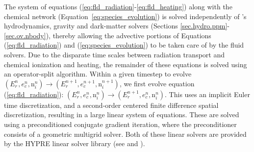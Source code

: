 
The system of equations
(\ref{eq:fld_radiation}-\ref{eq:fld_heating}) along with the chemical network 
(Equation~\ref{eq:species_evolution}) is solved
independently of \enzo's hydrodynamics, gravity and dark-matter solvers
(Sections \ref{sec.hydro.ppm}-\ref{sec.ov.nbody}), thereby allowing
the advective portions of Equations (\ref{eq:fld_radiation}) and
(\ref{eq:species_evolution}) to be taken care of by the fluid solvers.
Due to the disparate time scales between radiation transport and chemical
ionization and heating, the remainder of these equations is solved
using an operator-split algorithm.  Within a given timestep to evolve
$(E_r^n, e_c^n, {\mathrm n}_i^n) \to (E_r^{n+1}, e_c^{n+1}, {\mathrm
n}_i^{n+1})$, we first evolve equation (\ref{eq:fld_radiation}):
$(E_r^n, e_c^n, {\mathrm n}_i^n) \to (E_r^{n+1}, e_c^{n}, {\mathrm
  n}_i^{n})$.  This uses an implicit Euler time discretization, and a
second-order centered finite difference spatial discretization,
resulting in a large linear system of equations.  These are solved
using a preconditioned conjugate gradient iteration, where the
preconditioner consists of a geometric multigrid solver.  Both of
these linear solvers are provided by the HYPRE linear solver library
(see \cite{FalgoutYang2002} and \cite{hypre-manual}). 

